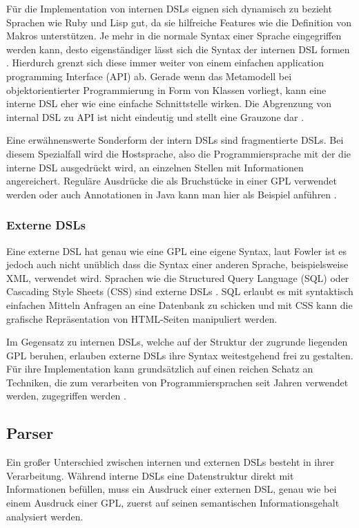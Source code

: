 \documentclass[12pt,oneside,a4paper,parskip]{scrbook}
\begin{document}
Für die Implementation von internen DSLs eignen sich dynamisch zu bezieht Sprachen wie Ruby und Lisp gut, da sie hilfreiche Features wie die Definition von Makros unterstützen. Je mehr in die normale Syntax einer Sprache eingegriffen werden kann, desto eigenständiger lässt sich die Syntax der internen DSL formen \cite[S. 98]{stahl2007}. Hierdurch grenzt sich diese immer weiter von einem einfachen application programming Interface (API) ab. Gerade wenn das Metamodell bei objektorientierter Programmierung in Form von Klassen vorliegt, kann eine interne DSL eher wie eine einfache Schnittstelle wirken. Die Abgrenzung von internal DSL zu API ist nicht eindeutig und stellt eine Grauzone dar \cite[S. 67]{fowler2010}.

Eine erwähnenswerte Sonderform der intern DSLs sind fragmentierte DSLs. Bei diesem Spezialfall wird die Hostsprache, also die Programmiersprache mit der die interne DSL ausgedrückt wird, an einzelnen Stellen mit Informationen angereichert. Reguläre Ausdrücke die als Bruchstücke in einer GPL verwendet werden oder auch Annotationen in Java kann man hier als Beispiel anführen \cite[S. 32]{fowler2010}.

\subsubsection{Externe DSLs}

Eine externe DSL hat genau wie eine GPL eine eigene Syntax, laut Fowler ist es jedoch auch nicht unüblich dass die Syntax einer anderen Sprache, beispielsweise XML,  verwendet wird. Sprachen wie die Structured Query Language (SQL) oder Cascading Style Sheets (CSS) sind externe DSLs \cite[S. 28]{fowler2010}. SQL erlaubt es mit syntaktisch einfachen Mitteln Anfragen an eine Datenbank zu schicken und mit CSS kann die grafische Repräsentation von HTML-Seiten manipuliert werden.

Im Gegensatz zu internen DSLs, welche auf der Struktur der zugrunde liegenden GPL beruhen, erlauben externe DSLs ihre Syntax weitestgehend frei zu gestalten. Für ihre Implementation kann grundsätzlich auf einen reichen Schatz an Techniken, die zum verarbeiten von Programmiersprachen seit Jahren verwendet werden, zugegriffen werden \cite[S. 89]{fowler2010}.

\subsection{Parser}

Ein großer Unterschied zwischen internen und externen DSLs besteht in ihrer Verarbeitung. Während interne DSLs eine Datenstruktur direkt mit Informationen befüllen, muss ein Ausdruck einer externen DSL, genau wie bei einem Ausdruck einer GPL, zuerst auf seinen semantischen Informationsgehalt analysiert werden.
\end{document}
